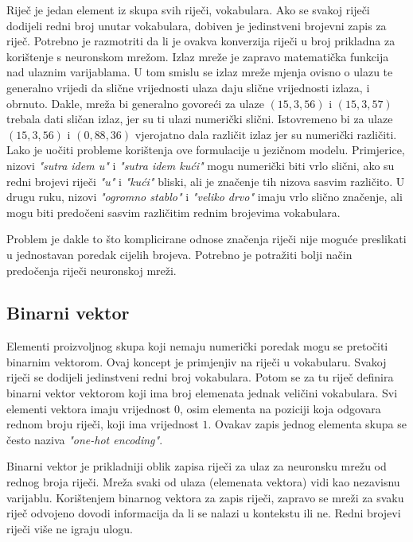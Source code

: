 \documentclass[times, utf8, diplomski, numeric]{fer}
\begin{document}
Riječ je jedan element iz skupa svih riječi, vokabulara. Ako se svakoj riječi dodijeli redni broj unutar vokabulara, dobiven je jedinstveni brojevni zapis za riječ. Potrebno je razmotriti da li je ovakva konverzija riječi u broj prikladna za korištenje s neuronskom mrežom. Izlaz mreže je zapravo matematička funkcija nad ulaznim varijablama. U tom smislu se izlaz mreže mjenja ovisno o ulazu te generalno vrijedi da slične vrijednosti ulaza daju slične vrijednosti izlaza, i obrnuto. Dakle, mreža bi generalno govoreći za ulaze $(15, 3, 56)$ i $(15, 3, 57)$ trebala dati sličan izlaz, jer su ti ulazi numerički slični. Istovremeno bi za ulaze $(15, 3, 56)$ i $(0, 88, 36)$ vjerojatno dala različit izlaz jer su numerički različiti. Lako je uočiti probleme korištenja ove formulacije u jezičnom modelu. Primjerice, nizovi \textit{"sutra idem u"} i \textit{"sutra idem kući"} mogu numerički biti vrlo slični, ako su redni brojevi riječi \textit{"u"} i \textit{"kući"} bliski, ali je značenje tih nizova sasvim različito. U drugu ruku, nizovi \textit{"ogromno stablo"} i \textit{"veliko drvo"} imaju vrlo slično značenje, ali mogu biti predočeni sasvim različitim rednim brojevima vokabulara.

Problem je dakle to što komplicirane odnose značenja riječi nije moguće preslikati u jednostavan poredak cijelih brojeva. Potrebno je potražiti bolji način predočenja riječi neuronskoj mreži.

\subsection{Binarni vektor}

Elementi proizvoljnog skupa koji nemaju numerički poredak mogu se pretočiti binarnim vektorom. Ovaj koncept je primjenjiv na riječi u vokabularu. Svakoj riječi se dodijeli jedinstveni redni broj vokabulara. Potom se za tu riječ definira binarni vektor vektorom koji ima broj elemenata jednak veličini vokabulara. Svi elementi vektora imaju vrijednost $0$, osim elementa na poziciji koja odgovara rednom broju riječi, koji ima vrijednost $1$. Ovakav zapis jednog elementa skupa se često naziva \textit{"one-hot encoding"}.

Binarni vektor je prikladniji oblik zapisa riječi za ulaz za neuronsku mrežu od rednog broja riječi. Mreža svaki od ulaza (elemenata vektora) vidi kao nezavisnu varijablu. Korištenjem binarnog vektora za zapis riječi, zapravo se mreži za svaku riječ odvojeno dovodi informacija da li se nalazi u kontekstu ili ne. Redni brojevi riječi više ne igraju ulogu. 
\end{document}
